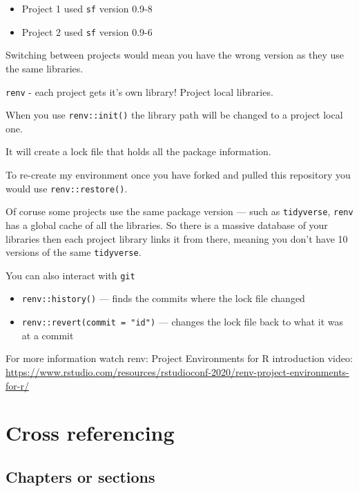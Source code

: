 \documentclass[
  12pt,
  oneside]{book}
\providecommand{\tightlist}{%
  \setlength{\itemsep}{0pt}\setlength{\parskip}{0pt}}
\begin{document}
\begin{itemize}
\tightlist
\item
  Project 1 used \texttt{sf} version 0.9-8
\item
  Project 2 used \texttt{sf} version 0.9-6
\end{itemize}

Switching between projects would mean you have the wrong version as they use the same libraries.

\texttt{renv} - each project gets it's own library! Project local libraries.

When you use \texttt{renv::init()} the library path will be changed to a project local one.

It will create a lock file that holds all the package information.

To re-create my environment once you have forked and pulled this repository you would use \texttt{renv::restore()}.

Of coruse some projects use the same package version --- such as \texttt{tidyverse}, \texttt{renv} has a global cache of all the libraries. So there is a massive database of your libraries then each project library links it from there, meaning you don't have 10 versions of the same \texttt{tidyverse}.

You can also interact with \texttt{git}

\begin{itemize}
\tightlist
\item
  \texttt{renv::history()} --- finds the commits where the lock file changed
\item
  \texttt{renv::revert(commit\ =\ "id")} --- changes the lock file back to what it was at a commit
\end{itemize}

For more information watch renv: Project Environments for R introduction video: \url{https://www.rstudio.com/resources/rstudioconf-2020/renv-project-environments-for-r/}

\hypertarget{crossref}{%
\chapter{Cross referencing}\label{crossref}}

\hypertarget{chapters-or-sections}{%
\section{Chapters or sections}\label{chapters-or-sections}}
\end{document}
